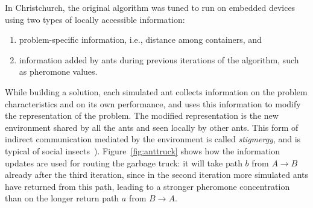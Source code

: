 \documentclass[10pt]{article}
\begin{document}
In Christchurch, the original algorithm was tuned to run on embedded devices using two types of locally accessible information: 
\begin{enumerate}
\item problem-specific information, i.e., distance among containers, and 
\item information added by ants during previous iterations of the algorithm, such as pheromone values.
\end{enumerate} 
While building a solution, each simulated ant collects information on the problem characteristics and on its own performance, and uses this information to modify the representation of the problem. The modified representation is the new environment shared by all the ants and seen locally by other ants. 
This form of indirect communication mediated by the environment is called {\it stigmergy}, and is typical of social insects~\cite{Dorigo97}).
Figure~\ref{fig:anttruck} shows how the information updates are used for
routing the garbage truck: it will take path $b$ from $A\rightarrow B$ already 
after the third iteration, since in the second iteration more simulated ants have 
returned from this path, leading to a stronger pheromone concentration than on the
longer return path $a$ from  $B\rightarrow A$.

\end{document}
